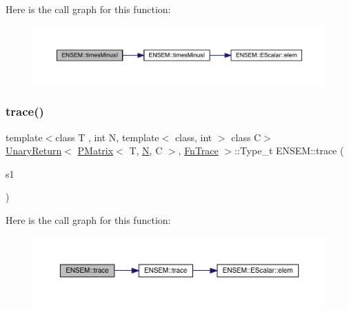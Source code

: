 Here is the call graph for this function\+:\nopagebreak
\begin{figure}[H]
\begin{center}
\leavevmode
\includegraphics[width=350pt]{df/d0a/group__primmatrix_ga937a4152dd7d0ceaec303ddbdbaf5a98_cgraph}
\end{center}
\end{figure}
\mbox{\label{group__primmatrix_gafc761796f6ca23ee43cd937f3459e3ce}} 
\subsubsection{\texorpdfstring{trace()}{trace()}}
{\footnotesize\ttfamily template$<$class T , int N, template$<$ class, int $>$ class C$>$ \\
\mbox{\hyperlink{structENSEM_1_1UnaryReturn}{Unary\+Return}}$<$ \mbox{\hyperlink{classENSEM_1_1PMatrix}{P\+Matrix}}$<$ T, \mbox{\hyperlink{operator__name__util_8cc_a7722c8ecbb62d99aee7ce68b1752f337}{N}}, C $>$, \mbox{\hyperlink{structENSEM_1_1FnTrace}{Fn\+Trace}} $>$\+::Type\+\_\+t E\+N\+S\+E\+M\+::trace (\begin{DoxyParamCaption}\item[{const \mbox{\hyperlink{classENSEM_1_1PMatrix}{P\+Matrix}}$<$ T, \mbox{\hyperlink{operator__name__util_8cc_a7722c8ecbb62d99aee7ce68b1752f337}{N}}, C $>$ \&}]{s1 }\end{DoxyParamCaption})\hspace{0.3cm}{\ttfamily [inline]}}

Here is the call graph for this function\+:\nopagebreak
\begin{figure}[H]
\begin{center}
\leavevmode
\includegraphics[width=350pt]{df/d0a/group__primmatrix_gafc761796f6ca23ee43cd937f3459e3ce_cgraph}
\end{center}
\end{figure}
\mbox{\label{group__primmatrix_ga1d05c45afa351dba712d9d083a013d41}} 

